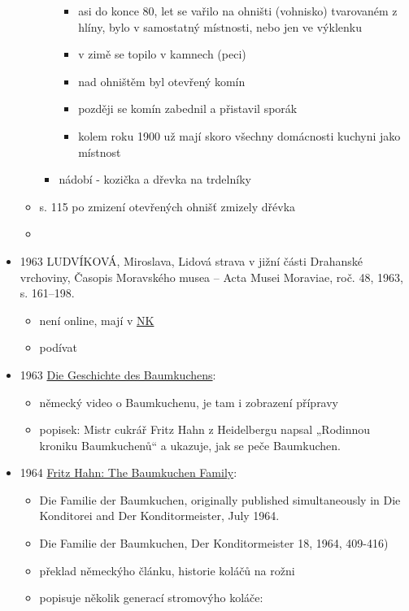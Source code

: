 \begin{itemize}
\begin{itemize}
\begin{itemize}
      \begin{itemize}
      \tightlist
      \item
        asi do konce 80, let se vařilo na ohništi (vohnisko) tvarovaném
        z hlíny, bylo v samostatný místnosti, nebo jen ve výklenku
      \item
        v zimě se topilo v kamnech (peci)
      \item
        nad ohništěm byl otevřený komín
      \item
        později se komín zabednil a přistavil sporák
      \item
        kolem roku 1900 už mají skoro všechny domácnosti kuchyni jako
        místnost
      \end{itemize}
    \item
      nádobí - kozička a dřevka na trdelníky
    \end{itemize}
  \item
    s. 115 po zmizení otevřených ohnišť zmizely dřévka
  \item
  \end{itemize}
\item
  1963 LUDVÍKOVÁ, Miroslava, Lidová strava v jižní části Drahanské
  vrchoviny, Časopis Moravského musea -- Acta Musei Moraviae, roč. 48,
  1963, s. 161--198.

  \begin{itemize}
  \tightlist
  \item
    není online, mají v
    \href{https://www.knihovny.cz/Record/nkp.SLK01-000511327?sid=30934569}{NK}
  \item
    podívat
  \end{itemize}
\item
  1963
  \href{https://www.ardmediathek.de/video/swr-retro-abendschau/die-geschichte-des-baumkuchens/swr/Y3JpZDovL3N3ci5kZS9hZXgvbzExNzY4MDA}{Die
  Geschichte des Baumkuchens}:

  \begin{itemize}
  \tightlist
  \item
    německý video o Baumkuchenu, je tam i zobrazení přípravy
  \item
    popisek: Mistr cukrář Fritz Hahn z Heidelbergu napsal „Rodinnou
    kroniku Baumkuchenů`` a ukazuje, jak se peče Baumkuchen.
  \end{itemize}
\item
  1964 \href{https://cakes.institute/hahn64.html}{Fritz Hahn: The
  Baumkuchen Family}:

  \begin{itemize}
  \tightlist
  \item
    Die Familie der Baumkuchen, originally published simultaneously in
    Die Konditorei and Der Konditormeister, July 1964.
  \item
    Die Familie der Baumkuchen, Der Konditormeister 18, 1964, 409-416)
  \item
    překlad německýho článku, historie koláčů na rožni
  \item
    popisuje několik generací stromovýho koláče:


\end{itemize}
\end{itemize}
